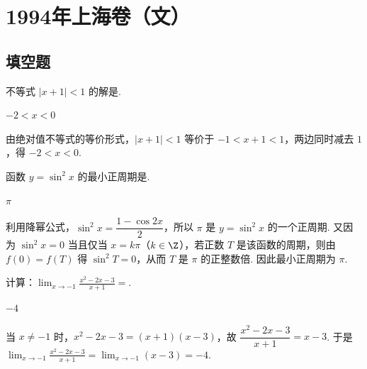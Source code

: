 \documentclass[UTF8,a4paper,oneside,11pt]{ctexbook}
\begin{document}
\mainmatter

\chapter{1994年上海卷（文）}
\section{填空题}

\begin{problem}
不等式 \(|x + 1| < 1 \) 的解是\fillinblank{}.
\end{problem}

\begin{answer}
\(-2 < x < 0\)
\end{answer}

\begin{solution}
由绝对值不等式的等价形式，\(|x+1|<1\) 等价于 \(-1<x+1<1\)，两边同时减去 \(1\)，得 \(-2<x<0\).
\end{solution}

\begin{problem}
函数 \(y = \sin^{2} x \) 的最小正周期是\fillinblank{}.
\end{problem}

\begin{answer}
\(\pi\)
\end{answer}

\begin{solution}
利用降幂公式，\(\sin^2x=\dfrac{1-\cos2x}{2}\)，所以 \(\pi\) 是 \(y=\sin^2x\) 的一个正周期. 又因为 \(\sin^2x=0\) 当且仅当 \(x=k\pi\)（\(k\in\Z\)），若正数 \(T\) 是该函数的周期，则由 \(f(0)=f(T)\) 得 \(\sin^2T=0\)，从而 \(T\) 是 \(\pi\) 的正整数倍. 因此最小正周期为 \(\pi\).
\end{solution}

\begin{problem}
计算：\(\displaystyle\lim_{x\to-1}\frac{x^{2}-2x-3}{x+1}= \)\fillinblank{}.
\end{problem}

\begin{answer}
\(-4\)
\end{answer}

\begin{solution}
当 \(x\ne-1\) 时，\(x^2-2x-3=(x+1)(x-3)\)，故
\(\dfrac{x^2-2x-3}{x+1}=x-3\). 于是
\(\displaystyle\lim_{x\to-1}\frac{x^2-2x-3}{x+1}=\lim_{x\to-1}(x-3)=-4\).
\end{solution}
\end{document}

